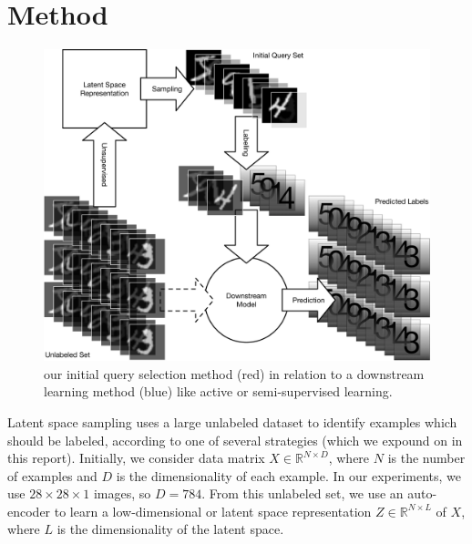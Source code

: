 \documentclass[a4paper]{article}
\begin{document}
\section{Method}
\label{sec:method}

\begin{figure}
  \centering
  \includegraphics[width=\linewidth]{docs/query_selection}
  \caption{our initial query selection method (red) in relation to a downstream
    learning method (blue) like active or semi-supervised learning.}
  \label{fig:overview}
\end{figure}



Latent space sampling uses a large unlabeled dataset to identify examples which
should be labeled, according to one of several strategies (which we expound on
in this report). Initially, we consider data matrix
$X \in \mathbb{R}^{N\times D}$, where $N$ is the number of examples and $D$ is
the dimensionality of each example. In our experiments, we use
$28 \times 28 \times 1$ images, so $D = 784$. From this unlabeled set, we use an
auto-encoder to learn a low-dimensional or latent space representation
$Z \in \mathbb{R}^{N\times L}$ of $X$, where $L$ is the dimensionality of the
latent space.
\end{document}
